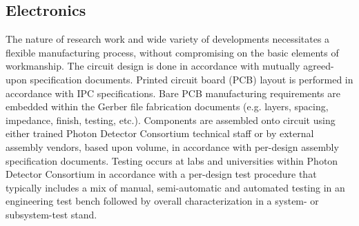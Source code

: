 \subsection{Electronics}
\label{sec:fdsp-pd-assy-pde}

The nature of research work and wide variety of developments necessitates a flexible manufacturing process, without compromising on the basic elements of workmanship. The circuit design is done in accordance with mutually agreed-upon specification documents. Printed circuit board (PCB) layout is performed in accordance with IPC specifications. Bare PCB manufacturing requirements are embedded within the Gerber file fabrication documents (e.g. layers, spacing, impedance, finish, testing, etc.). Components are assembled onto circuit using either trained Photon Detector Consortium  technical staff or by external assembly vendors, based upon volume, in accordance with per-design assembly specification documents. Testing occurs at labs and universities within Photon Detector Consortium in accordance with a per-design test procedure that typically includes a mix of manual, semi-automatic and automated testing in an engineering test bench followed by overall characterization in a system- or subsystem-test stand.

